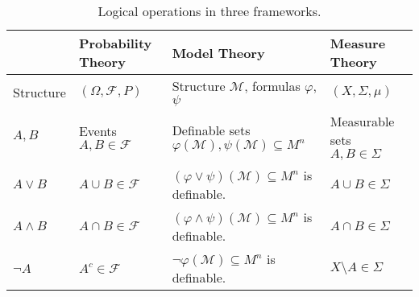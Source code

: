 \begin{table}[H]
    \centering
    \renewcommand{\arraystretch}{1.3}
    \begin{tabular}{|p{3cm}|p{3cm}|p{3cm}|p{3cm}|}
        \hline
        &
        \textbf{Probability Theory}
        &
        \textbf{Model Theory}
        &
        \textbf{Measure Theory} \\
        \hline
        Structure
        &
        $(\Omega,\mathcal{F},P)$
        &
        Structure $\mathcal{M}$, formulas $\varphi$, $\psi$
        &
        $(X,\Sigma,\mu)$ \\
        \hline
        $A,B$ &
        Events $A,B\in\mathcal{F}$
        &
        Definable sets \newline
        $\varphi(\mathcal{M}), \psi(\mathcal{M}) \subseteq M^n$
        &
        Measurable sets $A,B\in\Sigma$ \\
        \hline
        $A \lor B$
        &
        $A\cup B \in \mathcal{F}$
        &
        $(\varphi \lor \psi)(\mathcal{M}) \subseteq M^n$ is definable.
        &
        $A\cup B \in \Sigma$ \\
        \hline
        $A \land B$
        &
        $A\cap B \in \mathcal{F}$
        &
        $(\varphi \land \psi)(\mathcal{M}) \subseteq M^n$ is definable.
        &
        $A\cap B \in \Sigma$ \\
        \hline
        $\lnot A$
        &
        $A^c \in \mathcal{F}$
        &
        $\lnot\varphi(\mathcal{M})  \subseteq M^n$ is definable.
        &
        $X\setminus A \in \Sigma$ \\
        \hline
    \end{tabular}
    \caption{Logical operations in three frameworks.}\label{tab:table-comparison}
\end{table}
